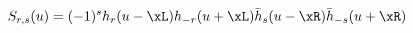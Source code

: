 \begin{equation}
S_{r,s}(u) %
  = (-1)^{s}h_r(u-\xL)h_{-r}(u+\xL)\bar{h}_{s}(u-\xR)\bar{h}_{-s}(u+\xR)
\end{equation}

